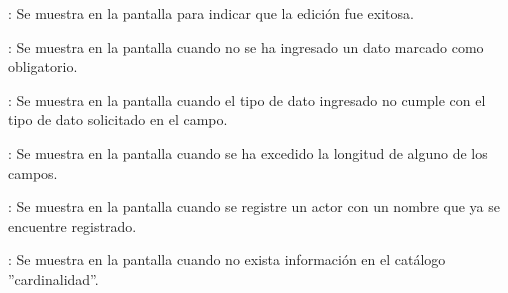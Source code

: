 \begin{Citemize}
	\item {}: Se muestra en la pantalla  para indicar que la edición fue exitosa.
	\item {}: Se muestra en la pantalla  cuando no se ha ingresado un dato marcado como obligatorio.
	\item {}: Se muestra en la pantalla  cuando el tipo de dato ingresado no cumple con el tipo de dato solicitado en el campo.
	\item {}: Se muestra en la pantalla  cuando se ha excedido la longitud de alguno de los campos.
	\item {}: Se muestra en la pantalla  cuando se registre un actor con un nombre que ya se encuentre registrado.
	\item {}: Se muestra en la pantalla  cuando no exista información en el catálogo ''cardinalidad''.
\end{Citemize}
